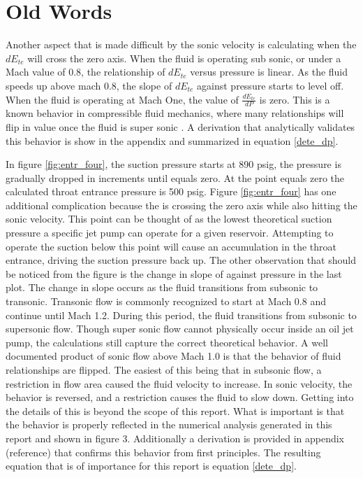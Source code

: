 \section{Old Words}

Another aspect that is made difficult by the sonic velocity is calculating when the $dE_{te}$ will cross the zero axis. When the fluid is operating sub sonic, or under a Mach value of 0.8, the relationship of $dE_{te}$ versus pressure is linear. As the fluid speeds up above mach 0.8, the slope of $dE_{te}$ against pressure starts to level off. When the fluid is operating at Mach One, the value of $\frac{dE_{te}}{dP}$ is zero. This is a known behavior in compressible fluid mechanics, where many relationships will flip in value once the fluid is super sonic \cite{fluids_white}. A derivation that analytically validates this behavior is show in the appendix and summarized in equation \eqref{dete_dp}. 

In figure \ref{fig:entr_four}, the suction pressure starts at 890 psig, the pressure is gradually dropped in increments until \dete equals zero. At the point \dete equals zero the calculated throat entrance pressure is 500 psig. Figure \ref{fig:entr_four} has one additional complication because the \dete is crossing the zero axis while also hitting the sonic velocity. This point can be thought of as the lowest theoretical suction pressure a specific jet pump can operate for a given reservoir. Attempting to operate the suction below this point will cause an accumulation in the throat entrance, driving the suction pressure back up. The other observation that should be noticed from the figure is the change in slope of \dete against pressure in the last plot. The change in slope occurs as the fluid transitions from subsonic to transonic. Transonic flow is commonly recognized to start at Mach 0.8 and continue until Mach 1.2. During this period, the fluid transitions from subsonic to supersonic flow. Though super sonic flow cannot physically occur inside an oil jet pump, the calculations still capture the correct theoretical behavior. A well documented product of sonic flow above Mach 1.0 is that the behavior of fluid relationships are flipped. The easiest of this being that in subsonic flow, a restriction in flow area caused the fluid velocity to increase. In sonic velocity, the behavior is reversed, and a restriction causes the fluid to slow down. Getting into the details of this is beyond the scope of this report. What is important is that the behavior is properly reflected in the numerical analysis generated in this report and shown in figure 3. Additionally a derivation is provided in appendix (reference) that confirms this behavior from first principles. The resulting equation that is of importance for this report is equation \eqref{dete_dp}.

